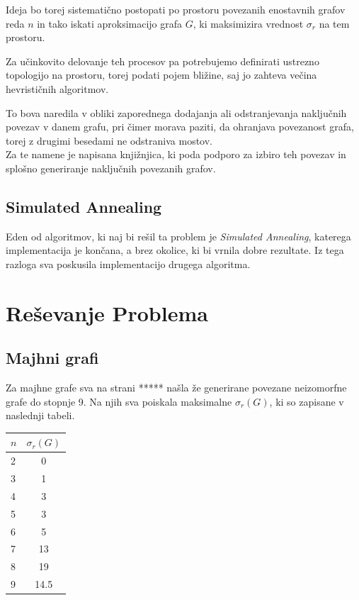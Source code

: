 \documentclass[ letterpaper, titlepage, fleqn]{article}
\begin{document}
Ideja bo torej sistematično postopati po prostoru povezanih enostavnih grafov reda $n$ in 
tako iskati aproksimacijo grafa $G$, ki maksimizira vrednost $\sigma_r$ na tem prostoru.

Za učinkovito delovanje teh procesov pa potrebujemo definirati ustrezno topologijo 
na prostoru, torej podati pojem bližine, saj jo zahteva večina hevrističnih algoritmov.

To bova naredila v obliki zaporednega dodajanja ali odstranjevanja naključnih povezav v 
danem grafu, pri čimer morava paziti, da ohranjava povezanost grafa, 
torej z drugimi besedami ne odstraniva mostov.\\
Za te namene je napisana knjižnjica, ki poda podporo za izbiro teh povezav
in splošno generiranje naključnih povezanih grafov.

\subsection{Simulated Annealing}
Eden od algoritmov, ki naj bi rešil ta problem je {\em Simulated Annealing}, 
katerega implementacija je končana, a brez okolice, ki bi vrnila dobre rezultate.
Iz tega razloga sva poskusila implementacijo drugega algoritma.

\section{Reševanje Problema}

\subsection{Majhni grafi}
Za majhne grafe sva na strani ***** našla že generirane povezane neizomorfne grafe do stopnje 9.
Na njih sva poiskala maksimalne $\sigma_r(G)$, ki so zapisane v naslednji tabeli.

\begin{center}
    \begin{tabular}{|  l | c | }
      \hline
      $n$ & $\sigma_r(G)$ \\ \hline
      2 & 0 \\ 
      3 & 1 \\ 
      4 & 3 \\ 
      5 & 3 \\ 
      6 & 5 \\ 
      7 & 13 \\ 
      8 & 19 \\ 
      9 & 14.5 \\ 
      \hline
    \end{tabular}
\end{center}
\end{document}
